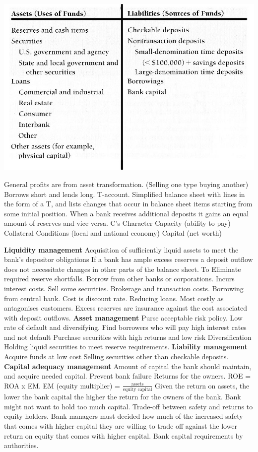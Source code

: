 \documentclass[12pt]{examnotes}
\begin{document}
\includegraphics[scale=0.5]{./imgs/111.jpg}

\ra General profits are from asset transformation. (Selling one type buying another) 
\ra Borrows short and lends long.
\ra T-account. Simplified balance sheet with lines in the form of a T, and lists changes that occur in balance sheet items starting from some initial position.
\ra When a bank receives additional deposits it gains an equal amount of reserves and vice versa.
 C's
 Character
 Capacity (ability to pay)
 Collateral
 Conditions (local and national economy)
 Capital (net worth)


{\bf Liquidity management}
\ra Acquisition of sufficiently liquid assets to meet the bank's depositor obligations
\ra If a bank has ample excess reserves a deposit outflow does not necessitate changes in other parts of the balance sheet.
\ra To Eliminate required reserve shortfalls.
 Borrow from other banks or corporations. Incurs interest costs.
 Sell some securities. Brokerage and transaction costs. 
 Borrowing from central bank. Cost is discount rate.
 Reducing loans. Most costly as antagonises customers.
\ra Excess reserves are insurance against the cost associated with deposit outflows.
{\bf Asset management}
\ra Purse acceptable risk policy. Low rate of default and diversifying.
 Find borrowers who will pay high interest rates and not default
 Purchase securities with high returns and low risk 
 Diversification
 Holding liquid securities to meet reserve requirements.
{\bf Liability management}
\ra Acquire funds at low cost
\ra Selling securities other than checkable deposits.
{\bf Capital adequacy management}
\ra Amount of capital the bank should maintain, and acquire needed capital.
 Prevent bank failure
 Returns for the owners. ROE = ROA x EM. EM (equity multiplier) = $\frac{\text{assets}}{\text{equity capital}}$ Given the return on assets, the lower the bank capital the higher the return for the owners of the bank. Bank might not want to hold too much capital.
\rna Trade-off between safety and returns to equity holders. Bank managers must decided how much of the increased safety that comes with higher capital they are willing to trade off against the lower return on equity that comes with higher capital.
 Bank capital requirements by authorities.
\end{document}
